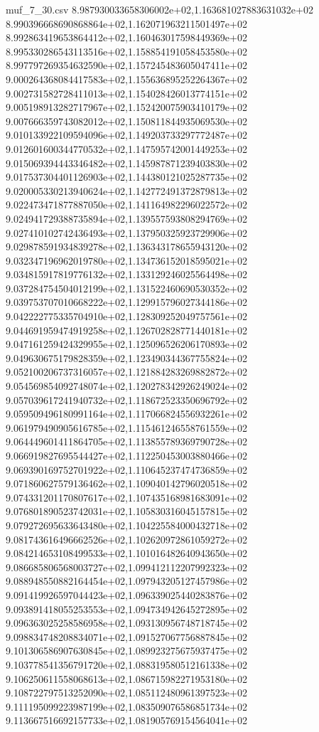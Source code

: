 \begin{filecontents*}{muf_7_30.csv}
8.987930033658306002e+02,1.163681027883631032e+02
8.990396668690868864e+02,1.162071963211501497e+02
8.992863419653864412e+02,1.160463017598449369e+02
8.995330286543113516e+02,1.158854191058453580e+02
8.997797269354632590e+02,1.157245483605047411e+02
9.000264368084417583e+02,1.155636895252264367e+02
9.002731582728411013e+02,1.154028426013774151e+02
9.005198913282717967e+02,1.152420075903410179e+02
9.007666359743082012e+02,1.150811844935069530e+02
9.010133922109594096e+02,1.149203733297772487e+02
9.012601600344770532e+02,1.147595742001449253e+02
9.015069394443346482e+02,1.145987871239403830e+02
9.017537304401126903e+02,1.144380121025287735e+02
9.020005330213940624e+02,1.142772491372879813e+02
9.022473471877887050e+02,1.141164982296022572e+02
9.024941729388735894e+02,1.139557593808294769e+02
9.027410102742436493e+02,1.137950325923729906e+02
9.029878591934839278e+02,1.136343178655943120e+02
9.032347196962019780e+02,1.134736152018595021e+02
9.034815917819776132e+02,1.133129246025564498e+02
9.037284754504012199e+02,1.131522460690530352e+02
9.039753707010668222e+02,1.129915796027344186e+02
9.042222775335704910e+02,1.128309252049757561e+02
9.044691959474919258e+02,1.126702828771440181e+02
9.047161259424329955e+02,1.125096526206170893e+02
9.049630675179828359e+02,1.123490344367755824e+02
9.052100206737316057e+02,1.121884283269882872e+02
9.054569854092748074e+02,1.120278342926249024e+02
9.057039617241940732e+02,1.118672523350696792e+02
9.059509496180991164e+02,1.117066824556932261e+02
9.061979490905616785e+02,1.115461246558761559e+02
9.064449601411864705e+02,1.113855789369790728e+02
9.066919827695544427e+02,1.112250453003880466e+02
9.069390169752701922e+02,1.110645237474736859e+02
9.071860627579136462e+02,1.109040142796020518e+02
9.074331201170807617e+02,1.107435168981683091e+02
9.076801890523742031e+02,1.105830316045157815e+02
9.079272695633643480e+02,1.104225584000432718e+02
9.081743616496662526e+02,1.102620972861059272e+02
9.084214653108499533e+02,1.101016482640943650e+02
9.086685806568003727e+02,1.099412112207992323e+02
9.088948550882164454e+02,1.097943205127457986e+02
9.091419926597044423e+02,1.096339025440283876e+02
9.093891418055253553e+02,1.094734942645272895e+02
9.096363025258586958e+02,1.093130956748718745e+02
9.098834748208834071e+02,1.091527067756887845e+02
9.101306586907630845e+02,1.089923275675937475e+02
9.103778541356791720e+02,1.088319580512161338e+02
9.106250611558068613e+02,1.086715982271953180e+02
9.108722797513252090e+02,1.085112480961397523e+02
9.111195099223987199e+02,1.083509076586851734e+02
9.113667516692157733e+02,1.081905769154564041e+02

\end{filecontents*}
